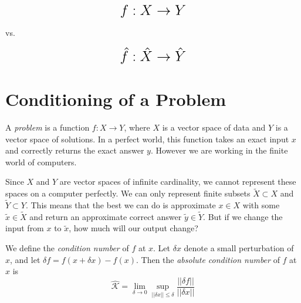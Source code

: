 \label{lab:conditioning_stability}


\begin{equation*}
\mathlarger{ \mathlarger{ \mathlarger{f:X \rightarrow Y}}}
\end{equation*}
\begin{center} vs. \end{center}
\begin{equation*}
\mathlarger{ \mathlarger{ \mathlarger{\hat{f}:\hat{X} \rightarrow \hat{Y}}}}
\end{equation*}

% 

\section*{Conditioning of a Problem}


A \emph{problem} is a function $f:X \rightarrow Y$, where $X$ is a vector space of data and $Y$ is a vector space of solutions. In a perfect world, this function takes an exact input $x$ and correctly returns the exact answer $y$. However we are working in the finite world of computers.

Since $X$ and $Y$ are vector spaces of infinite cardinality, we cannot represent these spaces on a computer perfectly. We can only represent finite subsets $\tilde{X} \subset X$ and $\tilde{Y} \subset Y$. This means that the best we can do is approximate $x \in X$ with some $\tilde{x} \in \tilde{X}$ and return an approximate correct answer $\tilde{y} \in \tilde{Y}$. But if we change the input from $x$ to $\tilde{x}$, how much will our output change?

We define the \emph{condition number} of $f$ at $x$. Let $\delta x$ denote a small perturbation of $x$, and let $\delta f = f(x+\delta x) - f(x)$. Then the \emph{absolute condition number} of $f$ at $x$ is 
 \[
\hat{\mathcal{K}} = \lim_{\delta \rightarrow 0} \sup_{||\delta x|| \leq \delta} { \frac{|| \delta f||}{||\delta x||} } 
\]

